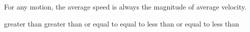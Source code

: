 \documentclass[12pt]{../ossphysics}
\begin{document}
\begin{questions}
  \question For any motion, the average speed is always
  \underline{\hspace{.8in}} the magnitude of average velocity.
  \begin{choices}
    \choice greater than
    \choice greater than or equal to
    \choice equal to
    \choice less than or equal to
    \choice less than
  \end{choices}
\end{questions}
\end{document}
